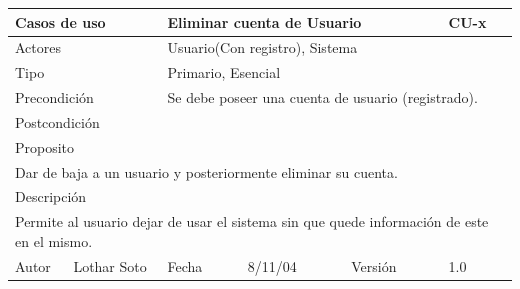 \documentclass{article}
\begin{document}
\begin{table}[h]
\begin{tabular}{|l|l|l|l|l|l|}
\hline
\multicolumn{2}{|p{2cm}|}{Casos de uso}  & \multicolumn{3}{p{7cm}|}{Eliminar cuenta de Usuario} & CU-x \\
\hline
\multicolumn{2}{|p{2cm}|}{Actores}       & \multicolumn{4}{p{8cm}|}{Usuario(Con registro), Sistema}        \\
\hline
\multicolumn{2}{|p{2cm}|}{Tipo}          & \multicolumn{4}{p{8cm}|}{Primario, Esencial}        \\
\hline
\multicolumn{2}{|p{2cm}|}{Precondición}  & \multicolumn{4}{p{8cm}|}{Se debe poseer una cuenta de usuario (registrado).}        \\
\hline
\multicolumn{2}{|p{2cm}|}{Postcondición} & \multicolumn{4}{p{8cm}|}{}        \\
\hline
\multicolumn{6}{|p{10cm}|}{Proposito}                                   \\
\hline
\multicolumn{6}{|p{10cm}|}{Dar de baja a un usuario y posteriormente eliminar su cuenta.}                                            \\
\hline
\multicolumn{6}{|p{10cm}|}{Descripción}                                 \\
\hline
\multicolumn{6}{|p{10cm}|}{Permite al usuario dejar de usar el sistema sin que quede información de este en el mismo.}                                            \\
\hline
Autor          &       Lothar Soto        & Fecha    &  8/11/04   &   Versión  & 1.0\\     
\hline
\end{tabular}
\end{table}
\end{document}
